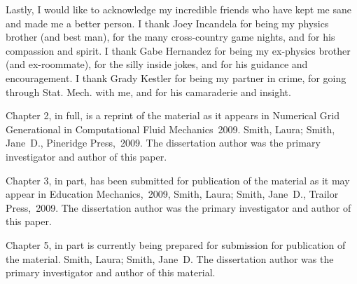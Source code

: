\begin{acknowledgements}
Lastly, I would like to acknowledge my incredible friends who have kept me sane and made me a better person. 
I thank Joey Incandela for being my physics brother (and best man), for the many cross-country game nights, and for his compassion and spirit. 
I thank Gabe Hernandez for being my ex-physics brother (and ex-roommate), for the silly inside jokes, and for his guidance and encouragement. 
I thank Grady Kestler for being my partner in crime, for going through Stat. Mech. with me, and for his camaraderie and insight. 

Chapter 2, in full, is a reprint of the material as it appears in
Numerical Grid Generational in Computational Fluid Mechanics~2009.
Smith, Laura; Smith, Jane~D., Pineridge Press,~2009. The dissertation
author was the primary investigator and author of this paper.

Chapter 3, in part, has been submitted for publication of the material
as it may appear in Education Mechanics,~2009, Smith, Laura; Smith,
Jane~D., Trailor Press,~2009. The dissertation author was the primary
investigator and author of this paper.

Chapter 5, in part is currently being prepared for submission for
publication of the material. Smith, Laura; Smith, Jane~D\@. The
dissertation author was the primary investigator and author of this
material.
\end{acknowledgements}
